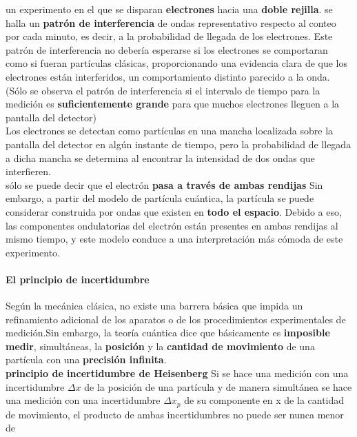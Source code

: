 \documentclass[10pt]{article}
\begin{document}
un experimento en el que se disparan \textbf{electrones} hacia una \textbf{doble rejilla}. se halla un \textbf{patrón de interferencia} de ondas representativo respecto al conteo por cada minuto, es decir, a la probabilidad de llegada de los electrones. Este patrón de interferencia no debería esperarse si los electrones se comportaran como si fueran partículas clásicas, proporcionando una evidencia clara de que los electrones están interferidos, un comportamiento distinto parecido a la onda. (Sólo se observa el patrón de interferencia si el intervalo de tiempo para la medición es \textbf{suficientemente grande} para que muchos electrones lleguen a la pantalla del detector)\\
\linebreak
Los electrones se detectan como partículas en una mancha localizada sobre la pantalla del detector en algún instante de tiempo, pero la probabilidad de llegada a dicha mancha se determina al encontrar la intensidad de dos ondas que interfieren.\\
\linebreak
sólo se puede decir que el electrón \textbf{pasa a través de ambas rendijas} Sin embargo, a partir del modelo de partícula cuántica, la partícula se puede considerar construida por ondas que existen en \textbf{todo el espacio}. Debido a eso, las componentes ondulatorias del electrón están presentes en ambas rendijas al mismo tiempo, y este modelo conduce a una interpretación más cómoda de este experimento.

\paragraph{El principio de incertidumbre}
Según la mecánica clásica, no existe una barrera básica que impida un refinamiento adicional de los aparatos o de los procedimientos experimentales de medición.Sin embargo, la teoría cuántica dice que básicamente es \textbf{imposible medir}, simultáneas, la \textbf{posición} y la \textbf{cantidad de movimiento} de una partícula con una \textbf{precisión infinita}.\\
\linebreak
\textbf{principio de incertidumbre de Heisenberg} Si se hace una medición con una incertidumbre $\Delta x$ de la posición de una partícula y de manera simultánea se hace una medición con una incertidumbre $\Delta x_p$ de su componente en x de la cantidad de movimiento, el producto de ambas incertidumbres no puede ser nunca menor de
\end{document}
